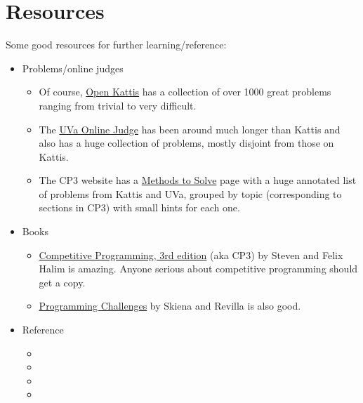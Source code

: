 \documentclass[10pt]{book}
\newif\iftodos
\newcommand{\todo}[1]{\iftodos\textcolor{red}{[TODO: #1]}\fi}
\begin{document}
\chapter{Resources} \label{chap:resources}

Some good resources for further learning/reference:

\begin{itemize}
\item Problems/online judges
  \begin{itemize}
  \item Of course, \href{http://open.kattis.com}{Open Kattis} has a
    collection of over 1000 great problems ranging from trivial to
    very difficult.
  \item The \href{https://uva.onlinejudge.org/}{UVa Online Judge} has
    been around much longer than Kattis and also has a huge collection
    of problems, mostly disjoint from those on Kattis.
  \item The CP3 website has a
    \href{https://cpbook.net/methodstosolve}{Methods to Solve} page
    with a huge annotated list of problems from Kattis and UVa,
    grouped by topic (corresponding to sections in CP3) with small
    hints for each one.
  \end{itemize}
\item Books
  \begin{itemize}
  \item \href{http://cpbook.net}{Competitive Programming, 3rd edition}
    (aka CP3) by Steven and Felix Halim is amazing.  Anyone serious
    about competitive programming should get a copy.
  \item
    \href{http://acm.cs.buap.mx/downloads/Programming_Challenges.pdf}{Programming
      Challenges} by Skiena and Revilla is also good.
  \end{itemize}
\item Reference
  \begin{itemize}
  \item \todo{Geeksforgeeks}
  \item \todo{Topcoder}
  \item \todo{Codeforces}
  \item \todo{cp-algorithms.com}
  \end{itemize}
\end{itemize}
\end{document}
